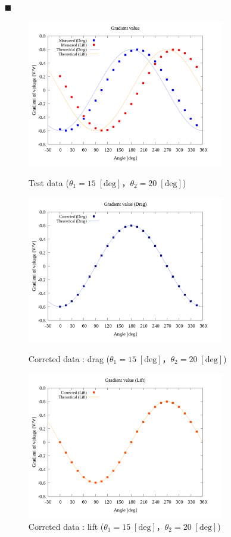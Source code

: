 \documentclass[twocolumn,a4j]{jsarticle}
\begin{document}
\begin{itemize}
    \item [$\blacksquare$] \\
          \begin{figure}[htbp]
              \footnotesize
              \begin{center}
                  \includegraphics[width=86mm]{../graphes/simulation_150_200/20/20_adjust-value.png}
                  \caption{Test data ($\theta_1 = 15 \; [\mathrm{deg}]$，$\theta_2 = 20 \; [\mathrm{deg}]$)}
                  \includegraphics[width=86mm]{../graphes/simulation_150_200/21/21-2_corrected_drag.png}
                  \caption{Corrcted data : drag ($\theta_1 = 15 \; [\mathrm{deg}]$，$\theta_2 = 20 \; [\mathrm{deg}]$)}
                  \includegraphics[width=86mm]{../graphes/simulation_150_200/21/21-2_corrected_lift.png}
                  \caption{Corrcted data : lift ($\theta_1 = 15 \; [\mathrm{deg}]$，$\theta_2 = 20 \; [\mathrm{deg}]$)}
                \end{center}
          \end{figure}       
\end{itemize}
\end{document}
